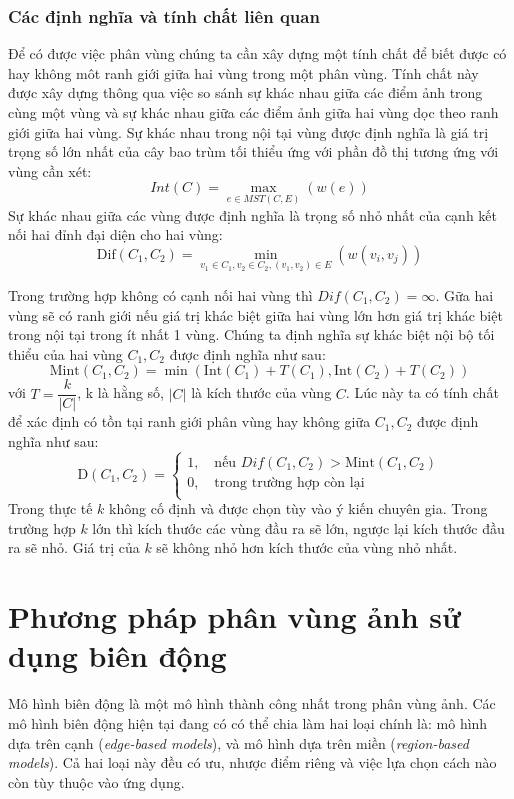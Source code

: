 \documentclass[12pt, oneside, a4paper]{book}
\begin{document}
\subsection{Các định nghĩa và tính chất liên quan}
Để có được việc phân vùng chúng ta cần xây dựng một tính chất để biết được có hay không môt ranh giới giữa hai vùng trong một phân vùng. Tính chất này được xây dựng thông qua việc so sánh sự khác nhau giữa các điểm ảnh trong cùng một vùng và sự khác nhau giữa các điểm ảnh giữa hai vùng dọc theo ranh giới giữa hai vùng.
Sự khác nhau trong nội tại vùng được định nghĩa là giá trị trọng số lớn nhất của cây bao trùm tối thiểu ứng với phần đồ thị tương ứng với vùng cần xét:
\begin{equation*}
Int(C)=\max_{e\in MST(C,E)}(w(e))
\end{equation*}
Sự khác nhau giữa các vùng được định nghĩa là trọng số nhỏ nhất của cạnh kết nối hai đỉnh đại diện cho hai vùng:
\begin{equation*}
\text{Dif}(C_1,C_2)=\min_{v_1\in C_1, v_2 \in C_2,(v_1, v_2) \in E}(w(v_i, v_j))
\end{equation*}

Trong trường hợp không có cạnh nối hai vùng thì $Dif(C_1,C_2)= \infty$. Gữa hai vùng sẽ có ranh giới nếu giá trị khác biệt giữa hai vùng lớn hơn giá trị khác biệt trong nội tại trong ít nhất 1 vùng. 
Chúng ta định nghĩa  sự khác biệt nội bộ tối thiểu của hai vùng $C_1, C_2$ được định nghĩa như sau: 
\begin{equation*}
\text{Mint}(C_1, C_2)= \min(\text{Int}(C_1)+T(C_1),\text{Int}(C_2)+T(C_2))
\end{equation*}
với $T=\dfrac{k}{|C|}$, k là hằng số, $|C|$ là kích thước của vùng $C$. Lúc này ta có tính chất để xác định có tồn tại ranh giới phân vùng hay không giữa $C_1, C_2$  được định nghĩa như sau:
\begin{equation*}
\text{D}(C_1, C_2)=
\begin{cases}
 1,\quad \textrm{nếu } Dif(C_1, C_2)>\text{Mint}(C_1, C_2)\\
 0,\quad \textrm{trong trường hợp còn lại}\\
   \end{cases}
\end{equation*}
Trong thực tế $k$ không cố định và được chọn tùy vào ý kiến chuyên gia. Trong trường hợp $ k$ lớn thì kích thước các vùng đầu ra sẽ lớn, ngược lại kích thước đầu ra sẽ nhỏ. Giá trị của $k$ sẽ không nhỏ hơn kích thước  của vùng nhỏ nhất.
\chapter{Phương pháp phân vùng ảnh sử dụng biên động}
Mô hình biên động là một mô hình thành công nhất trong phân vùng ảnh. Các mô hình biên động hiện tại đang có có thể chia làm hai loại chính là: mô hình dựa trên cạnh (\textit{edge-based models}), và mô hình dựa trên miền (\textit{region-based models}). Cả hai loại này đều có ưu, nhược điểm riêng và việc lựa chọn cách nào còn tùy thuộc vào ứng dụng.
\end{document}

